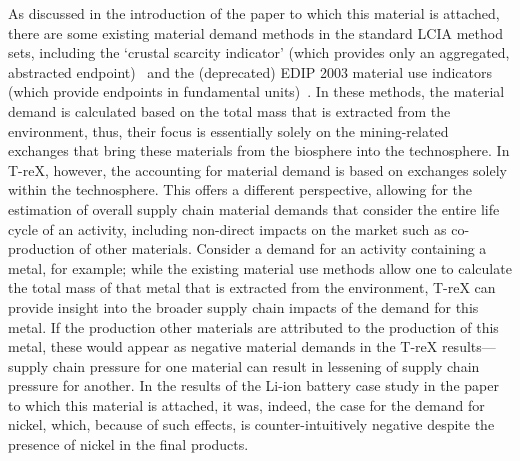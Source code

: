 \documentclass{article}
\begin{document}
As discussed in the introduction of the paper to which this material is attached, there are some existing material demand methods in the standard LCIA method sets, including the `crustal scarcity indicator' (which provides only an aggregated, abstracted endpoint)~\citep{arvidsson2020csi} and the (deprecated) EDIP 2003 material use indicators (which provide endpoints in fundamental units)~\citep{hauschild2003edip}. In these methods, the material demand is calculated based on the total mass that is extracted from the environment, thus, their focus is essentially solely on the mining-related exchanges that bring these materials from the biosphere into the technosphere. In T-reX, however, the accounting for material demand is based on exchanges solely within the technosphere. This offers a different perspective, allowing for the estimation of overall supply chain material demands that consider the entire life cycle of an activity, including non-direct impacts on the market such as co-production of other materials. Consider a demand for an activity containing a metal, for example; while the existing material use methods allow one to calculate the total mass of that metal that is extracted from the environment, T-reX can provide insight into the broader supply chain impacts of the demand for this metal. If the production other materials are attributed to the production of this metal, these would appear as negative material demands in the T-reX results---supply chain pressure for one material can result in lessening of supply chain pressure for another. In the results of the Li-ion battery case study in the paper to which this material is attached, it was, indeed, the case for the demand for nickel, which, because of such effects, is counter-intuitively negative despite the presence of nickel in the final products.
\end{document}

